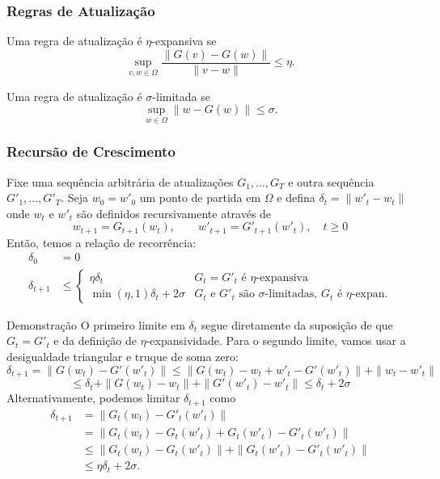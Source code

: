 \documentclass{beamer}
\begin{document}
\begin{frame}
\frametitle{Regras de Atualização}
\begin{definition}[2.3]
Uma regra de atualização é \(\eta\)-expansiva se
$$ \sup_{v,w \in \Omega} \frac{\|G(v) - G(w)\|}{\|v - w\|} \le \eta. $$ 
\end{definition}

\begin{definition}[2.4]
Uma regra de atualização é \(\sigma\)-limitada se
$$ \sup_{w \in \Omega} \|w - G(w)\| \le \sigma. $$ 
\end{definition}
\end{frame}
 

\begin{frame}
\frametitle{Recursão de Crescimento}
\begin{lemma}[2.5] Fixe uma sequência arbitrária de atualizações \(G_{1},\ldots,G_{T}\) e outra sequência \(G'_{1},\ldots,G'_{T}\). Seja \(w_{0}=w'_{0}\) um ponto de partida em \(\Omega\) e defina \(\delta_{t}=\|w'_{t}-w_{t}\|\) onde \(w_{t}\) e \(w'_{t}\) são definidos recursivamente através de 
\[w_{t+1}=G_{t+1}(w_{t}), \qquad  w'_{t+1}=G'_{t+1}(w'_{t}), \quad t\ge0\]
Então, temos a relação de recorrência: 
\small
\begin{align*}
     \delta_{0}&=0 \\
     \delta_{t+1} &\le \begin{cases} \eta\delta_{t} & G_{t}=G'_{t} \text{ é } \eta\text{-expansiva} \\ \min(\eta,1)\delta_{t}+2\sigma & G_{t} \text{ e } G'_{t} \text{ são } \sigma\text{-limitadas, } G_{t} \text{ é } \eta\text{-expan.} \end{cases}
\end{align*} 
\end{lemma}
\end{frame}

\begin{frame}{Demonstração}
O primeiro limite em \(\delta_{t}\) segue diretamente da suposição de que \(G_{t}=G'_{t}\) e da definição de $\eta$-expansividade.  
Para o segundo limite, vamos usar a desigualdade triangular e truque de soma zero:
{\small
$$ \delta_{t+1} = \|G(w_{t}) - G'(w'_{t})\| \le \|G(w_{t})-w_{t}+w'_{t}-G'(w'_{t})\| + \|w_{t}-w'_{t}\| $$
$$ \le \delta_{t} + \|G(w_{t})-w_{t}\| + \|G'(w'_{t})-w'_{t}\| \le \delta_{t} + 2\sigma $$
}
Alternativamente, podemos limitar \(\delta_{t+1}\) como
\small
\begin{align*}
\delta_{t+1} &= \|G_{t}(w_{t})-G'_{t}(w'_{t})\| \\
&= \|G_{t}(w_{t})-G_{t}(w'_{t})+G_{t}(w'_{t})-G'_{t}(w'_{t})\| \\
&\le \|G_{t}(w_{t})-G_{t}(w'_{t})\| + \|G_{t}(w'_{t})-G'_{t}(w'_{t})\| \\
&\le \eta\delta_{t} + 2\sigma.
\end{align*} 
\end{frame}
\end{document}
